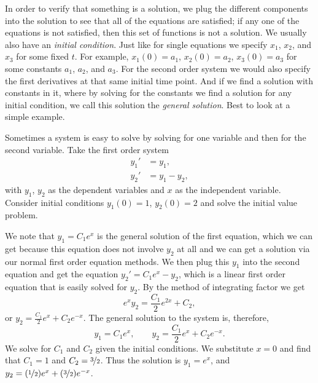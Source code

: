 \documentclass{ximera}
\begin{document}
In order to verify that something is a solution, we plug the different components into the solution to see that all of the equations are satisfied; if any one of the equations is not satisfied, then this set of functions is not a solution. We usually also have an \emph{initial condition}.  Just like for single equations we specify $x_1$, $x_2$, and $x_3$ for some fixed $t$. For example, $x_1(0) = a_1$, $x_2(0) = a_2$, $x_3(0) = a_3$ for some constants $a_1$, $a_2$, and $a_3$.  For the second order system we would also specify the first derivatives at that same initial time point. And if we find a solution with constants in it, where by solving for the constants we find a solution for any initial condition, we call this solution the \emph{general solution}. Best to look at a simple example.

\begin{example}
    Sometimes a system is easy to solve by solving for one variable and then for the second variable. Take the first order system 
    \begin{align*}
        y_1' & = y_1 , \\
        y_2' & = y_1 - y_2 ,
    \end{align*}
    with $y_1$, $y_2$ as the dependent variables and $x$ as the independent variable.  Consider initial conditions $y_1(0) = 1$, $y_2(0) = 2$ and solve the initial value problem. 
\end{example}

\begin{exampleSol}
    We note that $y_1 = C_1 e^x$ is the general solution of the first equation, which we can get because this equation does not involve $y_2$ at all and we can get a solution via our normal first order equation methods. We then plug this $y_1$ into the second equation and get the equation $y_2' = C_1e^x - y_2$, which is a linear first order equation that is easily solved for $y_2$.  By the method of integrating factor we get 
    \begin{equation*}
        e^x y_2 = \frac{C_1}{2}e^{2x} + C_2 ,
    \end{equation*}
    or $y_2 = \frac{C_1}{2}e^{x} + C_2e^{-x}$.  The general solution to the system is, therefore,
    \begin{equation*}
        y_1 = C_1 e^x , \qquad y_2 = \frac{C_1}{2}e^{x} + C_2e^{-x} .
    \end{equation*}
    We solve for $C_1$ and $C_2$ given the initial conditions. We substitute $x=0$ and find that $C_1=1$ and $C_2=\nicefrac{3}{2}$.  Thus the solution is $y_1 = e^x$, and $y_2 = (\nicefrac{1}{2}) e^x + (\nicefrac{3}{2}) e^{-x}$.
\end{exampleSol}
\end{document}
